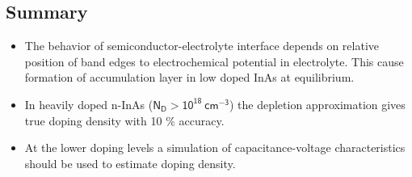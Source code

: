 \documentclass[final]{beamer}
\begin{document}
\begin{poster}
\section{Summary} \justifying
    \begin{itemize} \itemsep12pt
        \justifying
        \item The behavior of semiconductor-electrolyte interface depends on relative position of  band edges to electrochemical potential in electrolyte. This cause formation of accumulation layer in low doped InAs at equilibrium.
        \item     In heavily doped n-InAs ($\mathsf{N_D > 10^{18}\ cm^{-3}}$)  the depletion approximation gives true doping density with 10  \% accuracy.
        \item At the lower doping levels a simulation of capacitance-voltage characteristics should be used         to estimate doping density.
    \end{itemize}


\end{poster}
\end{document}
